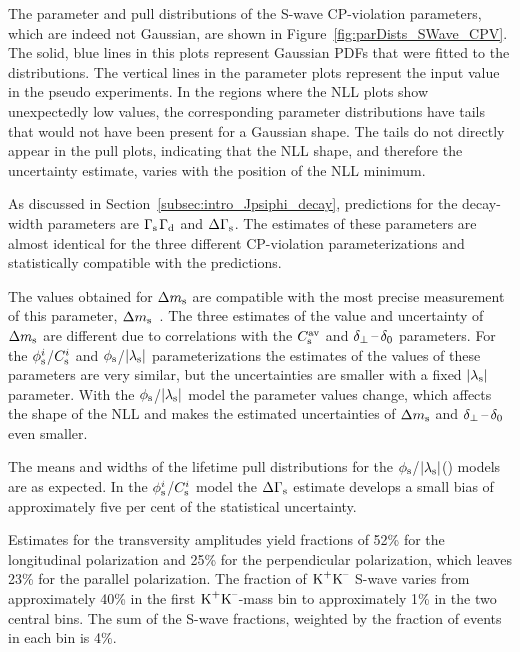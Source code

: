 The parameter and pull distributions of the S-wave CP-violation parameters, which are indeed not Gaussian, are shown in
Figure~\ref{fig:parDists_SWave_CPV}. The solid, blue lines in this plots represent Gaussian PDFs that were fitted to the distributions. The
vertical lines in the parameter plots represent the input value in the pseudo experiments. In the regions where the NLL plots show
unexpectedly low values, the corresponding parameter distributions have tails that would not have been present for a Gaussian shape. The
tails do not directly appear in the pull plots, indicating that the NLL shape, and therefore the uncertainty estimate, varies with the
position of the NLL minimum.

As discussed in Section~\ref{subsec:intro_Jpsiphi_decay}, predictions for the decay-width parameters are
$\Gamma_\text{s}$\textapprox$\Gamma_\text{d}$\unitsp\invps{} and $\Delta\Gamma_\text{s}$\unitsp\invps{}. The estimates of these
parameters are almost identical for the three different CP-violation parameterizations and statistically compatible with the predictions.

The values obtained for $\Delta m_\text{s}$ are compatible with the most precise measurement of this parameter,
$\Delta m_\text{s}$\unitsp\invps~\cite{LHCb-PAPER-2013-006}. The three estimates of the value and uncertainty of $\Delta m_\text{s}$ are
different due to correlations with the $C_\text{s}^\text{av}$ and $\delta_{\perp}\,\text{--}\,\delta_{0}$ parameters. For the $\phi_\text{s}^{i}$/$C_\text{s}^{i}$ and $\phi_\text{s}$/$|{\lambda_{\text{s}}}|$
parameterizations the estimates of the values of these parameters are very similar, but the uncertainties are smaller with a fixed
$|{\lambda_{\text{s}}}|$ parameter. With the $\phi_\text{s}$/$|{\lambda_{\text{s}}}|$ model the parameter values change, which affects the shape of the NLL and makes the
estimated uncertainties of $\Delta m_\text{s}$ and $\delta_{\perp}\,\text{--}\,\delta_{0}$ even smaller.

The means and widths of the lifetime pull distributions for the $\phi_\text{s}$/$|{\lambda_{\text{s}}}|$() models are as expected. In the $\phi_\text{s}^{i}$/$C_\text{s}^{i}$
model the $\Delta\Gamma_\text{s}$ estimate develops a small bias of approximately five per cent of the statistical uncertainty.

Estimates for the transversity amplitudes yield fractions of 52\% for the longitudinal \BstoJpsiphi{} polarization and 25\% for the
perpendicular polarization, which leaves 23\% for the parallel polarization. The fraction of $\text{K}^\text{+}\text{K}^\text{--}$ S-wave varies from approximately 40\% in
the first $\text{K}^\text{+}\text{K}^\text{--}$-mass bin to approximately 1\% in the two central bins. The sum of the S-wave fractions, weighted by the fraction of events
in each bin is 4\%.


